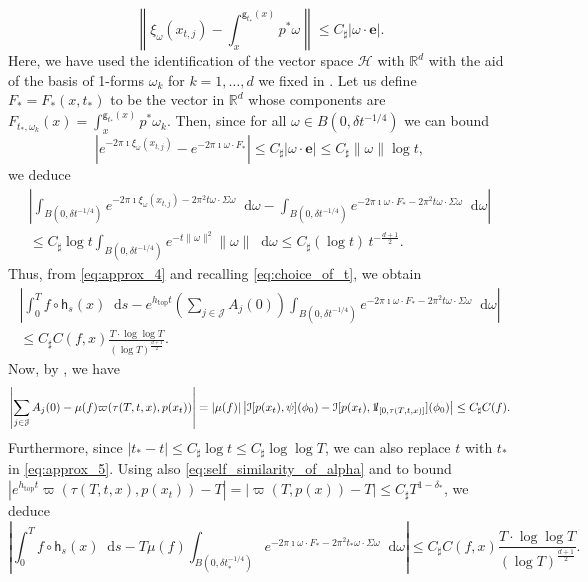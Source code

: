 \documentclass[11pt,letterpaper]{amsart}
\newcommand \R {{ \mathbb R}}
\newcommand \sC {{C_\sharp}}
\newcommand{\horo}{\mathsf{h}}
\newcommand{\geo}{\mathsf{g}}
\newcommand*{\diff}{\mathop{}\!\mathrm{d}}
\newcommand{\one}{{\rm 1\mskip-4mu l}}
\newcommand{\eb}{\mathbf{e}}
\DeclareMathOperator{\topp}{top}
\theoremstyle{definition}
\begin{document}
\[
\left\| \xi_{\omega}(x_{t,j})  - \int_x^{\geo_{t_{\ast}}(x)}p^{\ast}\omega \right\| \leq \sC | \omega \cdot \eb|.
\]
Here, we have used the identification of the vector space $\mathcal{H}$ with $\R^d$ with the aid of the basis of 1-forms $\omega_k$ for $k=1,\dots, d$   we fixed in .
Let us define $F_{\ast} = F_{\ast}(x,t_{\ast})$ to be the vector in $\R^d$ whose components are $F_{t_{\ast}, \omega_k}(x) = \int_x^{\geo_{t_{\ast}}(x)}p^{\ast}\omega_k$.
Then, since for all $\omega \in B(0,\delta t^{-1/4})$ we can bound 
\[
|e^{- 2 \pi \imath  \xi_{\omega}(x_{t,j}) } - e^{- 2 \pi \imath  \omega \cdot F_{\ast} } | \leq \sC |\omega \cdot \eb| \leq \sC \|\omega \| \log t,
\]
we deduce 
\begin{multline*}
\left\lvert  \int_{B(0,\delta t^{-1/4})} e^{- 2 \pi \imath  \xi_{\omega}(x_{t,j})  -2\pi^2 t \omega \cdot \Sigma \omega }  \diff \omega - \int_{B(0,\delta t^{-1/4})} e^{- 2 \pi \imath \omega \cdot F_{\ast}-2\pi^2 t \omega \cdot \Sigma \omega }  \diff \omega \right\rvert \\
\leq \sC \log t \int_{B(0,\delta t^{-1/4})} e^{-t \|\omega\|^2  } \|\omega\| \diff \omega \leq \sC (\log t) \, t^{-\frac{d+1}{2}}.
\end{multline*} 
Thus, from \eqref{eq:approx_4} and recalling \eqref{eq:choice_of_t}, we obtain
\begin{multline}\label{eq:approx_5}
	\left\lvert \int_{0}^{T} f \circ \horo_s(x) \diff s -e^{h_{\topp}t}  \left(\sum_{j \in \mathcal{J}} A_j(0)\right)  \int_{B(0,\delta t^{-1/4})} e^{- 2 \pi \imath \omega \cdot F_{\ast}-2\pi^2 t \omega \cdot \Sigma \omega } \diff \omega\right\rvert \\  \leq \sC C(f,x) \frac{T \cdot \log \log T}{(\log T)^{\frac{d+1}{2}}}. 
\end{multline}
Now, by , we have
\[
\left\lvert \sum_{j \in \mathcal{J}} A_j(0) -\mu(f) \varpi(\tau(T,t,x),p(x_t)) \right\rvert = |\mu(f)| \left\lvert  \mathcal{I}[p(x_{t}),\psi](\phi_0) -\mathcal{I}[p(x_{t}),\one_{[0,\tau(T,t,x)]}](\phi_0) \right\rvert \leq \sC C(f).
\]
Furthermore, since $|t_{\ast}-t| \leq \sC \log t \leq \sC \log \log T$, we can also replace $t$ with $t_{\ast}$ in \eqref{eq:approx_5}.
Using also \eqref{eq:self_similarity_of_alpha} and  to bound $|e^{h_{\topp}t} \varpi(\tau(T,t,x),p(x_t))  - T| = |\varpi(T,p(x))  - T|\leq \sC T^{1-\delta_{\ast}}$, we deduce
\begin{equation}\label{eq:approx_6}
	\left\lvert \int_{0}^{T} f \circ \horo_s(x) \diff s - T \mu(f)  \int_{B(0,\delta t_{\ast}^{-1/4})} e^{- 2 \pi \imath \omega \cdot F_{\ast}-2\pi^2 t_{\ast} \omega \cdot \Sigma \omega } \diff \omega\right\rvert  \leq \sC C(f,x) \frac{T \cdot \log \log T}{(\log T)^{\frac{d+1}{2}}}. 
\end{equation}
\end{document}
